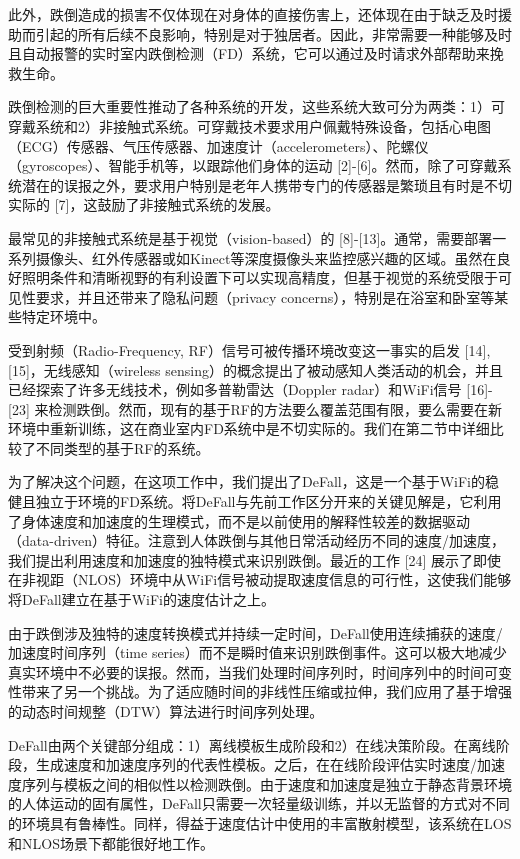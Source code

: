 \documentclass[journal]{IEEEtran}
\begin{document}
此外，跌倒造成的损害不仅体现在对身体的直接伤害上，还体现在由于缺乏及时援助而引起的所有后续不良影响，特别是对于独居者。因此，非常需要一种能够及时且自动报警的实时室内跌倒检测（FD）系统，它可以通过及时请求外部帮助来挽救生命。

跌倒检测的巨大重要性推动了各种系统的开发，这些系统大致可分为两类：1）可穿戴系统和2）非接触式系统。可穿戴技术要求用户佩戴特殊设备，包括心电图（ECG）传感器、气压传感器、加速度计（accelerometers）、陀螺仪（gyroscopes）、智能手机等，以跟踪他们身体的运动 [2]-[6]。然而，除了可穿戴系统潜在的误报之外，要求用户特别是老年人携带专门的传感器是繁琐且有时是不切实际的 [7]，这鼓励了非接触式系统的发展。

最常见的非接触式系统是基于视觉（vision-based）的 [8]-[13]。通常，需要部署一系列摄像头、红外传感器或如Kinect等深度摄像头来监控感兴趣的区域。虽然在良好照明条件和清晰视野的有利设置下可以实现高精度，但基于视觉的系统受限于可见性要求，并且还带来了隐私问题（privacy concerns），特别是在浴室和卧室等某些特定环境中。

受到射频（Radio-Frequency, RF）信号可被传播环境改变这一事实的启发 [14], [15]，无线感知（wireless sensing）的概念提出了被动感知人类活动的机会，并且已经探索了许多无线技术，例如多普勒雷达（Doppler radar）和WiFi信号 [16]-[23] 来检测跌倒。然而，现有的基于RF的方法要么覆盖范围有限，要么需要在新环境中重新训练，这在商业室内FD系统中是不切实际的。我们在第二节中详细比较了不同类型的基于RF的系统。

为了解决这个问题，在这项工作中，我们提出了DeFall，这是一个基于WiFi的稳健且独立于环境的FD系统。将DeFall与先前工作区分开来的关键见解是，它利用了身体速度和加速度的生理模式，而不是以前使用的解释性较差的数据驱动（data-driven）特征。注意到人体跌倒与其他日常活动经历不同的速度/加速度，我们提出利用速度和加速度的独特模式来识别跌倒。最近的工作 [24] 展示了即使在非视距（NLOS）环境中从WiFi信号被动提取速度信息的可行性，这使我们能够将DeFall建立在基于WiFi的速度估计之上。

由于跌倒涉及独特的速度转换模式并持续一定时间，DeFall使用连续捕获的速度/加速度时间序列（time series）而不是瞬时值来识别跌倒事件。这可以极大地减少真实环境中不必要的误报。然而，当我们处理时间序列时，时间序列中的时间可变性带来了另一个挑战。为了适应随时间的非线性压缩或拉伸，我们应用了基于增强的动态时间规整（DTW）算法进行时间序列处理。

DeFall由两个关键部分组成：1）离线模板生成阶段和2）在线决策阶段。在离线阶段，生成速度和加速度序列的代表性模板。之后，在在线阶段评估实时速度/加速度序列与模板之间的相似性以检测跌倒。由于速度和加速度是独立于静态背景环境的人体运动的固有属性，DeFall只需要一次轻量级训练，并以无监督的方式对不同的环境具有鲁棒性。同样，得益于速度估计中使用的丰富散射模型，该系统在LOS和NLOS场景下都能很好地工作。
\end{document}
